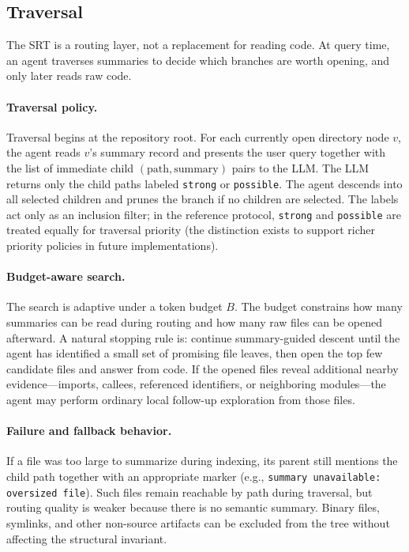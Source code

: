 \documentclass[11pt,a4paper]{article}
\newcommand{\srt}{\textsc{SRT}}
\newcommand{\tbudget}{B}
\begin{document}
\subsection{Traversal}\label{sec:traversal}

The \srt{} is a routing layer, not a replacement for reading code.
At query time, an agent traverses summaries to decide which branches are worth opening, and only later reads raw code.

\paragraph{Traversal policy.}
Traversal begins at the repository root.
For each currently open directory node $v$, the agent reads $v$'s summary record and presents the user query together with the list of immediate child $(\text{path}, \text{summary})$ pairs to the LLM.
The LLM returns only the child paths labeled \texttt{strong} or \texttt{possible}.
The agent descends into all selected children and prunes the branch if no children are selected.
The labels act only as an inclusion filter; in the reference protocol, \texttt{strong} and \texttt{possible} are treated equally for traversal priority (the distinction exists to support richer priority policies in future implementations).

\paragraph{Budget-aware search.}
The search is adaptive under a token budget $\tbudget$.
The budget constrains how many summaries can be read during routing and how many raw files can be opened afterward.
A natural stopping rule is: continue summary-guided descent until the agent has identified a small set of promising file leaves, then open the top few candidate files and answer from code.
If the opened files reveal additional nearby evidence---imports, callees, referenced identifiers, or neighboring modules---the agent may perform ordinary local follow-up exploration from those files.

\paragraph{Failure and fallback behavior.}
If a file was too large to summarize during indexing, its parent still mentions the child path together with an appropriate marker (e.g., \texttt{summary unavailable: oversized file}).
Such files remain reachable by path during traversal, but routing quality is weaker because there is no semantic summary.
Binary files, symlinks, and other non-source artifacts can be excluded from the tree without affecting the structural invariant.
\end{document}

